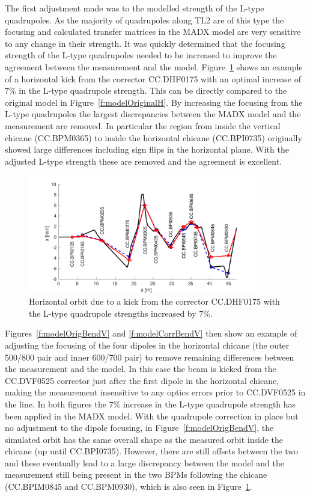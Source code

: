 The first adjustment made was to the modelled strength of the L-type quadrupoles. As the majority of quadrupoles along TL2 are of this type the focusing and calculated transfer matrices in the MADX model are very sensitive to any change in their strength. It was quickly determined that the focusing strength of the L-type quadrupoles needed to be increased to improve the agreement between the measurement and the model. Figure~\ref{f:modelCorrQuadH} shows an example of a horizontal kick from the corrector CC.DHF0175 with an optimal increase of \(7\%\) in the L-type quadrupole strength. This can be directly compared to the original model in Figure~\ref{f:modelOriginalH}. By increasing the focusing from the L-type quadrupoles the largest discrepancies between the MADX model and the measurement are removed. In particular the region from inside the vertical chicane (CC.BPM0365) to inside the horizontal chicane (CC.BPI0735) originally showed large differences including sign flips in the horizontal plane. With the adjusted L-type strength these are removed and the agreement is excellent.

\begin{figure}
  \centering
  \includegraphics[width=0.9\textwidth]{Figures/optics/modelCorrQuadH}
  \caption{Horizontal orbit due to a kick from the corrector CC.DHF0175 with the L-type quadrupole strengths increased by \(7\%\).}
  \label{f:modelCorrQuadH}
\end{figure}

Figures~\ref{f:modelOrigBendV} and \ref{f:modelCorrBendV} then show an example of adjusting the focusing of the four dipoles in the horizontal chicane (the outer 500/800 pair and inner 600/700 pair) to remove remaining differences between the measurement and the model. In this case the beam is kicked from the CC.DVF0525 corrector just after the first dipole in the horizontal chicane, making the measurement insensitive to any optics errors prior to CC.DVF0525 in the line. In both figures the \(7\%\) increase in the L-type quadrupole strength has been applied in the MADX model. With the quadrupole correction in place but no adjustment to the dipole focusing, in Figure~\ref{f:modelOrigBendV}, the simulated orbit has the same overall shape as the measured orbit inside the chicane (up until CC.BPI0735). However, there are still offsets between the two and these eventually lead to a large discrepancy between the model and the measurement still being present in the two BPMs following the chicane (CC.BPIM0845 and CC.BPM0930), which is also seen in Figure~\ref{f:modelCorrQuadH}. 

